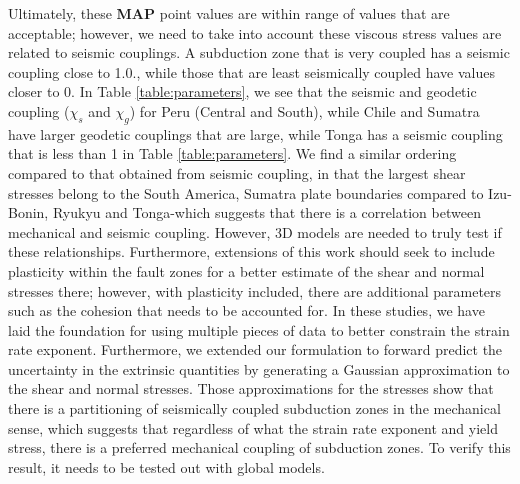 \documentclass[12pt]{article}
\begin{document}
{   Ultimately, these \textbf{MAP} point values are within range of values that are acceptable; however, we need to take into account these viscous stress values are related to seismic couplings. A subduction zone that is very coupled has a seismic coupling close to 1.0., while those that are least seismically coupled have values closer to 0.  In Table \ref{table:parameters}, we see that the seismic and geodetic coupling ($\chi_s$ and $\chi_g$) for Peru (Central and South), while Chile and Sumatra have larger geodetic couplings that are large, while Tonga has a seismic coupling that is less than 1 in Table \ref{table:parameters}. We find a similar ordering compared to that obtained from seismic coupling, in that the largest shear stresses belong to the South America, Sumatra plate boundaries compared to Izu-Bonin, Ryukyu and Tonga-which suggests that there is a correlation between mechanical and seismic coupling. However, 3D models are needed to truly test if these relationships. Furthermore, extensions of this work should seek to include plasticity within the fault zones for a better estimate of the shear and normal stresses there; however, with plasticity included, there are additional parameters such as the cohesion that needs to be accounted for. In these studies, we have laid the foundation for using multiple pieces of data to better constrain the strain rate exponent. Furthermore, we extended our formulation to forward predict the uncertainty in the extrinsic quantities by generating a Gaussian approximation to the shear and normal stresses. Those approximations for the stresses show that there is a partitioning of seismically coupled subduction zones in the mechanical sense, which suggests that regardless of what the strain rate exponent and  yield stress, there is a preferred mechanical coupling of subduction zones. To verify this result, it needs to be tested out with global models.
                 








\appendix
}
\end{document}
